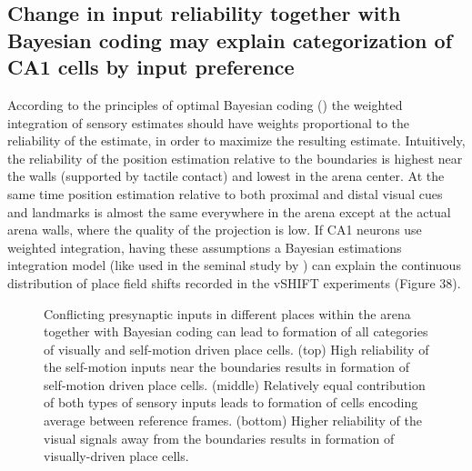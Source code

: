 \subsection{Change in input reliability together with Bayesian coding may explain categorization of CA1 cells by input preference}

According to the principles of optimal Bayesian coding (\cite{Pouget2003}) the weighted integration of sensory estimates should have weights proportional to the reliability of the estimate, in order to maximize the resulting estimate. Intuitively, the reliability of the position estimation relative to the boundaries is highest near the walls (supported by tactile contact) and lowest in the arena center. At the same time position estimation relative to both proximal and distal visual cues and landmarks is almost the same everywhere in the arena except at the actual arena walls, where the quality of the projection is low. If CA1 neurons use weighted integration, having these assumptions a Bayesian estimations integration model (like used in the seminal study by \cite{Ernst2002}) can explain the continuous distribution of place field shifts recorded in the vSHIFT experiments (Figure 38).

\begin{figure}
\captionsetup{format=plain}
\caption[Bayesian integration of sensory inputs]{
Conflicting presynaptic inputs in different places within the arena together with Bayesian coding can lead to formation of all categories of visually and self-motion driven place cells. (top) High reliability of the self-motion inputs near the boundaries results in formation of self-motion driven place cells. (middle) Relatively equal contribution of both types of sensory inputs leads to formation of cells encoding average between reference frames. (bottom) Higher reliability of the visual signals away from the boundaries results in formation of visually-driven place cells.
}
\label{fig:F38_weighted_integration}
\end{figure}

